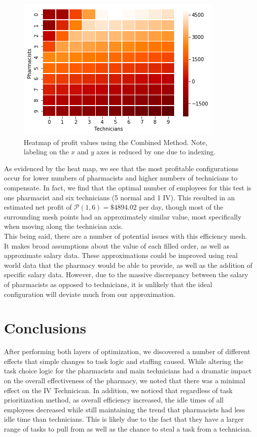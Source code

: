 \documentclass[10pt]{report}            %
\begin{document}
\begin{figure}[H]
\centering
\includegraphics[scale=.75]{profitheatmap.png}
\caption{Heatmap of profit values using the Combined Method. Note, labeling on the $x$ and $y$ axes is reduced by one due to indexing.}
\label{fig:heatmap}
\end{figure}
As evidenced by the heat map, we see that the most profitable configurations occur for lower numbers of pharmacists and higher numbers of technicians to compensate.  In fact, we find that the optimal number of employees for this test is one pharmacist and six technicians (5 normal and 1 IV). This resulted in an estimated net profit of $\mathcal{P}(1,6)=\$4894.02$ per day, though most of the surrounding mesh points had an approximately similar value, most specifically when moving along the technician axis.\\
This being said, there are a number of potential issues with this efficiency mesh. It makes broad assumptions about the value of each filled order, as well as approximate salary data. These approximations could be improved using real world data that the pharmacy would be able to provide, as well as the addition of specific salary data. However, due to the massive discrepancy between the salary of pharmacists as opposed to technicians, it is unlikely that the ideal configuration will deviate much from our approximation.
\section*{Conclusions}
After performing both layers of optimization, we discovered a number of different effects that simple changes to task logic and staffing caused. While altering the task choice logic for the pharmacists and main technicians had a dramatic impact on the overall effectiveness of the pharmacy, we noted that there was a minimal effect on the IV Technicican. In addition, we noticed that regardless of task prioritization method, as overall efficiency increased, the idle times of all employees decreased while still maintaining the trend that pharmacists had less idle time than technicians. This is likely due to the fact that they have a larger range of tasks to pull from as well as the chance to steal a task from a technician.
\end{document}
